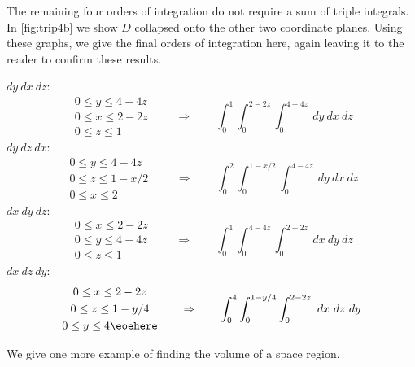\begin{example}
The remaining four orders of integration do not require a sum of triple integrals. In \autoref{fig:trip4b} we show $D$ collapsed onto the other two coordinate planes. Using these graphs, we give the final orders of integration here, again leaving it to the reader to confirm these results.

\noindent $dy\ dx\ dz$:\\[-\baselineskip]
\[
 \begin{gathered}
  0\leq y\leq 4-4z\\
  0\leq x\leq 2-2z\\
  0\leq z\leq 1
 \end{gathered} 
 \qquad\Rightarrow\qquad
 \int_0^1\int_{0}^{2-2z}\int_0^{4-4z}\ dy\ dx\ dz 
\]
\noindent $dy\ dz\ dx$:\\[-\baselineskip]
\[
 \begin{gathered}
  0\leq y\leq 4-4z\\
  0\leq z\leq 1-x/2\\
  0\leq x\leq 2
 \end{gathered}
 \qquad\Rightarrow\qquad
 \int_0^2\int_{0}^{1-x/2}\int_0^{4-4z}\ dy\ dx\ dz 
\]
\noindent $dx\ dy\ dz$:\\[-\baselineskip]
\[
 \begin{gathered}
  0\leq x\leq 2-2z\\
  0\leq y\leq 4-4z\\
  0\leq z\leq 1
 \end{gathered}
 \qquad\Rightarrow\qquad
 \int_0^1\int_{0}^{4-4z}\int_0^{2-2z}\ dx\ dy\ dz 
\]
\noindent $dx\ dz\ dy$:\\[-\baselineskip]
\[
 \begin{gathered}
  0\leq x\leq 2-2z\\
  0\leq z\leq 1-y/4\\
  0\leq y\leq 4 \eoehere
 \end{gathered}
 \qquad\Rightarrow\qquad
 \int_0^4\int_{0}^{1-y/4}\int_0^{2-2z}\ dx\ dz\ dy
\]
\end{example}

We give one more example of finding the volume of a space region.

